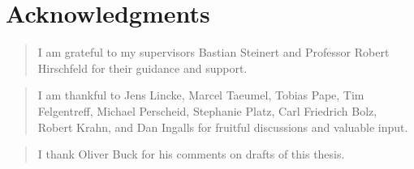 \begingroup
\let\raggedsection\centering

\chapter*{Acknowledgments} \label{cha:acknowledgments}
\endgroup

\begin{quotation}
  \noindent I am grateful to my supervisors Bastian Steinert and Professor Robert Hirschfeld for their guidance and support. 
\end{quotation}

\begin{quotation}
  \noindent I am thankful to Jens Lincke, Marcel Taeumel, Tobias Pape, Tim Felgentreff, Michael Perscheid, Stephanie Platz, Carl Friedrich Bolz, Robert Krahn, and Dan Ingalls for fruitful discussions and valuable input.
\end{quotation}

\begin{quotation}
  \noindent I thank Oliver Buck for his comments on drafts of this thesis.
\end{quotation}